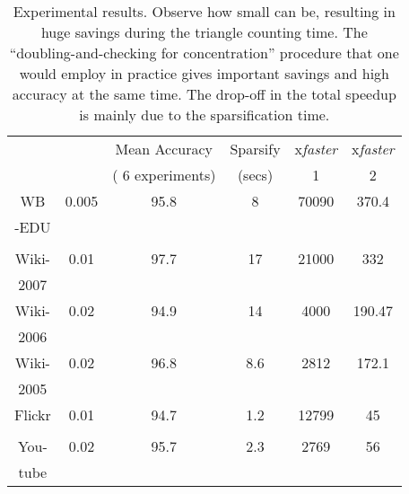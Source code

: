 \documentclass{llncs}
\begin{document}
\begin{table}[ht]
\begin{center}
\begin{tabular}{c|c|c|c|c|c}\hline \hline 
       &         &     Mean Accuracy                &  Sparsify          &  x\it{faster}     &  x\it{faster}            \\ 
    &  &    ( 6 experiments)     &  (secs)            &  1                &     2                     \\ \hline \hline
WB     &0.005 & 95.8                            &  8                 & 70090             &  370.4                      \\
-EDU   &      &                                 &                    &                   &  														\\ 
       &      &                                 &                    &                   &                               \\ \hline
Wiki-  & 0.01 & 97.7                            &  17                & 21000             &  332                           \\
2007   &      &                                 &                    &                   &                                 \\ \hline
Wiki-  & 0.02 & 94.9                            &  14                & 4000              &  190.47                                \\
2006   &      &                                 &                    &                   &                                   \\ \hline
Wiki-  & 0.02 & 96.8                            &  8.6               & 2812              &  172.1                             \\
2005   &      &                                 &                    &                   &                                     \\ \hline
Flickr & 0.01 & 94.7                            &  1.2               & 12799             &  45                                  \\
       &      &                                 &                    &                   &                                       \\    \hline
You-   & 0.02 & 95.7                            &  2.3               & 2769              &  56                                    \\     
tube   &      &                                 &                    &                   &                                         \\ \hline \hline 
\end{tabular}
\end{center}
\caption{ Experimental results. Observe how small can  be, resulting in huge savings during the triangle counting time. The 
``doubling-and-checking for concentration'' procedure that one would employ in practice gives important savings and high accuracy
at the same time. The drop-off in the total speedup is mainly due to the sparsification time.  }
\label{tab:results}
\end{table}
\end{document}
